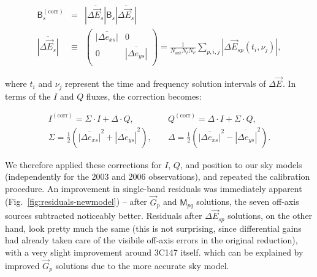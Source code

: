 \documentclass[]{aa}
\newcommand{\matrixtt}[4]{\left( \begin{array}{cc}#1&#2\\#3&#4\\\end{array} \right)}
\newcommand{\jones}[2]{\vec {#1}_{#2}}
\newcommand{\coh}[2]{\mathsf{{#1}}_{{#2}}}
\begin{document}
\begin{eqnarray*}
\coh{B}{s}^\mathrm{(corr)} & = & \overline{|\Delta\jones{E}{s}|} \coh{B}{s} \overline{|\Delta\jones{E}{s}|} \\
\overline{|\Delta\jones{E}{s}|} & \equiv & \matrixtt{\overline{|\Delta e_{xs}|}}{0}{0}{\overline{|\Delta e_{ys}|}} = \frac{1}{N_\mathrm{ant}N_t N_\nu} \sum_{p,i,j} |\Delta\jones{E}{sp}(t_i,\nu_j)|,
\end{eqnarray*}

where $t_i$ and $\nu_j$ represent the time and frequency solution intervals of $\Delta\jones{E}{}$. In terms of the $I$ and $Q$ fluxes, the correction becomes:

\begin{eqnarray*}
I^\mathrm{(corr)} = \Sigma \cdot I + \Delta \cdot Q, & \; &  Q^\mathrm{(corr)} = \Delta \cdot I + \Sigma \cdot Q, \\
\Sigma = \frac{1}{2}\left( \overline{|\Delta e_{xs}|}^2 + \overline{|\Delta e_{ys}|}^2 \right), 
& \; & \Delta = \frac{1}{2}\left( \overline{|\Delta e_{xs}|}^2 - \overline{|\Delta e_{ys}|}^2 \right).
\end{eqnarray*}

We therefore applied these corrections for $I$, $Q$, and position to our sky models (independently for the 2003 and 2006 observations), and repeated the calibration procedure. An improvement in single-band residuals was immediately apparent (Fig.~\ref{fig:residuals-newmodel}) -- after $\jones{G}{p}$ and $\coh{M}{pq}$ solutions, the seven off-axis sources subtracted noticeably better. Residuals after $\Delta\jones{E}{sp}$ solutions, on the other hand, look pretty much the same (this is not surprising, since differential gains had already taken care of the visibile off-axis errors in the original reduction), with a very slight improvement around 3C147 itself. 
which can be explained by improved $\jones{G}{p}$ solutions due to the more accurate sky model.
\end{document}
